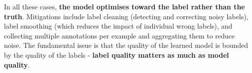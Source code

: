 In all these cases, \textbf{the model optimises toward the label rather than the truth}. Mitigations include label cleaning (detecting and correcting noisy labels), label smoothing (which reduces the impact of individual wrong labels), and collecting multiple annotations per example and aggregating them to reduce noise. The fundamental issue is that the quality of the learned model is bounded by the quality of the labels - \textbf{label quality matters as much as model quality}.
